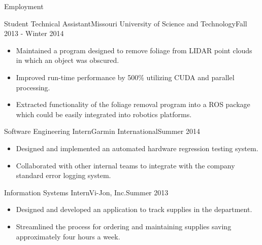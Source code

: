 \documentclass[]{mcdowellcv}
\begin{document}
\begin{cvsection}{Employment}
\begin{rockmech}
    \begin{cvsubsection}[2]{Student Technical Assistant}{Missouri University of Science and Technology}{Fall 2013 - Winter 2014}        
        \begin{itemize}
            \item Maintained a program designed to remove foliage from LIDAR point clouds in which an object was obscured.
            \item Improved run-time performance by 500\% utilizing CUDA and parallel processing.
            \item Extracted functionality of the foliage removal program into a ROS package which could be easily integrated into robotics platforms.
        \end{itemize}
    \end{cvsubsection}
\end{rockmech}
    
\begin{garmin}
    \begin{cvsubsection}{Software Engineering Intern}{Garmin International}{Summer 2014}   
        \begin{itemize}
            \item Designed and implemented an automated hardware regression testing system.
            \item Collaborated with other internal teams to integrate with the company standard error logging system.
        \end{itemize}
    \end{cvsubsection}
\end{garmin}

\begin{vijon}
    \begin{cvsubsection}{Information Systems Intern}{Vi-Jon, Inc.}{Summer 2013}
        \begin{itemize}
            \item Designed and developed an application to track supplies in the department.
            \item Streamlined the process for ordering and maintaining supplies saving approximately four hours a week.
        \end{itemize}
    \end{cvsubsection}
\end{vijon}

\end{cvsection}
\end{document}

